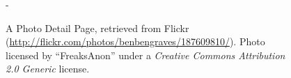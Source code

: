 \begin{figure}
\begin{adjustwidth*}{0em}{-\wholemargin}
\begin{minipage}[t]{0.475\wholewidth}
      \caption[Flickr Photo Detail Page]{%
         A Photo Detail Page,
         retrieved from Flickr
         (\url{http://flickr.com/photos/benbengraves/187609810/}).
         Photo licensed by ``FreaksAnon'' under a \emph{Creative Commons
         Attribution 2.0 Generic} license.}
      \label{figure:scrsh.flickr.photo.detail}
    \end{minipage}
  \end{adjustwidth*}
  \normalcaption
\end{figure}
